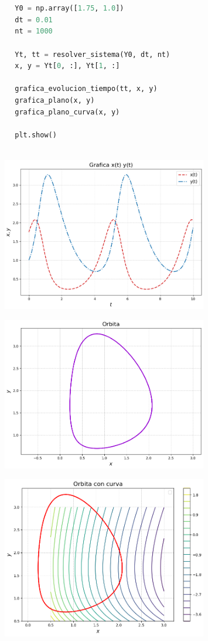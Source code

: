 \documentclass{report}
\begin{document}
\begin{lstlisting}[language=Python]
        
        
        Y0 = np.array([1.75, 1.0])
        dt = 0.01
        nt = 1000
        
        Yt, tt = resolver_sistema(Y0, dt, nt)
        x, y = Yt[0, :], Yt[1, :]
        
        grafica_evolucion_tiempo(tt, x, y)
        grafica_plano(x, y)
        grafica_plano_curva(x, y)
        
        plt.show()
        
    \end{lstlisting}

    \begin{figure}[h!]
        \centering
        \includegraphics[width=0.8\textwidth]{images/image1.png}
      \end{figure}

      \begin{figure}[h!]
        \centering
        \includegraphics[width=0.8\textwidth]{images/image2.png}
      \end{figure}
      \begin{figure}[h!]
        \centering
        \includegraphics[width=0.8\textwidth]{images/image3.png}
      \end{figure}
\end{document}

